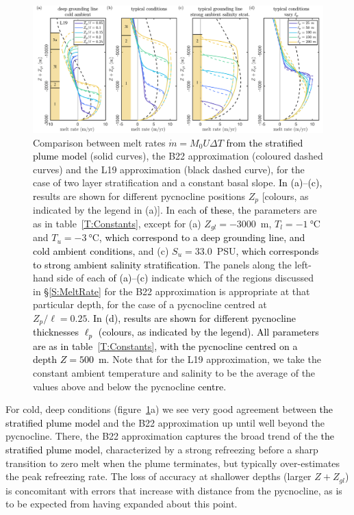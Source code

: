 \documentclass[openacc]{rsproca_new}%
\newcommand{\red}[1]{{\color{red} #1}}
\newcommand{\blue}[1]{{\color{blue} #1}}
\newcommand{\rout}[1]{\red{\st{#1}}}\newcommand{\ab}[1]{\textcolor{Green}{#1}}\newcommand{\about}[1]{\textcolor{Cyan}{\sout{#1}}}
\renewcommand{\rout}[1]{{}} %
\renewcommand{\blue}[1]{{\textcolor{black}{#1}}} %
\renewcommand{\red}[1]{{}} %
\begin{document}
\begin{figure}
\centering
\includegraphics[width = \textwidth]{./make_plots/plots/figure6.pdf}
\caption{Comparison between \rout{numerically obtained }melt rates $\dot{m}= M_0 U \Delta T$ \blue{from the stratified plume model} (solid curves), the B22 approximation (coloured dashed curves) and the L19 approximation (black dashed curve), for the case of two layer stratification and a constant basal slope. \blue{In (a)--(c),} \rout{R}\blue{r}esults are shown for different pycnocline positions $Z_p$ [colours, as indicated by the legend in (a)]. In each \rout{case}\blue{of these}, the parameters are as in table~\ref{T:Constants}, except for (a) $Z_{gl} = -3000$~m, $T_l = -1~\si{\celsius}$ and $T_u = -3~\si{\celsius}$\blue{, which correspond to a deep grounding line, and cold ambient conditions,} and (c)  $S_u = 33.0$~PSU\blue{, which corresponds to strong ambient salinity stratification}.  The panels along the left-hand side of each \rout{subplot}\blue{of (a)--(c)} indicate which of the regions discussed in \S\ref{S:MeltRate} for the B22 approximation is appropriate at that particular depth, for the case of a pycnocline centred at $Z_p/\ell = 0.25$. \blue{In (d), results are shown for different pycnocline thicknesses $\ell_p$ (colours, as indicated by the legend). All parameters are as in table~\ref{T:Constants}, with the pycnocline centred on a depth $Z = 500$~m.} Note that for the L19 approximation, we take the constant ambient temperature and salinity to be the average of the values above and below the pycnocline \blue{centre}.}\label{fig:Numerics:PycnoclinePosition}
\end{figure}

For cold, deep conditions (figure~\ref{fig:Numerics:PycnoclinePosition}a) we see very good agreement between \blue{the stratified plume model}\rout{numerically obtained melt rates} and the B22 approximation up until well beyond the pycnocline. There, the B22 approximation captures the broad trend of the \blue{the stratified plume model}\rout{numerical solutions}, characterized by a strong refreezing before a sharp transition to zero melt when the plume terminates, but typically over-estimates the peak refreezing rate. The loss of accuracy at shallower depths (larger $Z + Z_{gl}$) is concomitant with errors that increase with distance from the pycnocline, as is to be expected from having expanded about this point.
\end{document}
